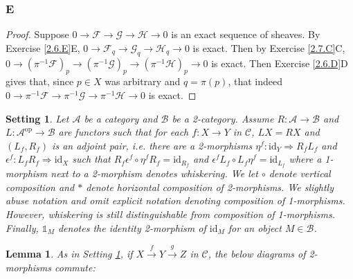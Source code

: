 \documentclass{article}
\newcommand{\id}{\mathrm{id}}
\newcommand{\fA}{\mathscr{A}}
\newcommand{\fB}{\mathscr{B}}
\newcommand{\fC}{\mathscr{C}}
\newcommand{\fF}{\mathscr{F}}
\newcommand{\fG}{\mathscr{G}}
\newcommand{\fH}{\mathscr{H}}
\newcommand{\altid}{\mathds{1}}
\DeclareMathOperator{\op}{op}
\newtheorem{lemma}[theorem]{Lemma}
\newtheorem{setting}{Setting}
\begin{document}
\subsubsection{E}\label{2.7.E}
\begin{proof}
    Suppose $0\to \fF \to \fG \to \fH \to 0$ is an exact sequence of sheaves. By Exercise \ref{2.6.E}E, $0\to \fF_q \to \fG_q\to \fH_q\to 0$ is exact. Then by Exercise \ref{2.7.C}C, $0\to (\pi^{-1} \fF)_p \to (\pi^{-1}\fG)_p\to (\pi^{-1} \fH)_p \to 0$ is exact. Then Exercise \ref{2.6.D}D gives that, since $p\in X$ was arbitrary and $q=\pi(p)$, that indeed $0\to \pi^{-1} \fF\to \pi^{-1} \fG \to \pi^{-1} \fH \to 0$ is exact.
\end{proof}
\begin{setting}\label{set:Adjoint functors into 2-category}
    Let $\fA$ be a category and $\fB$ be a 2-category. Assume $R:\fA \to \fB$ and $L:\fA^{\op} \to \fB$ are functors such that for each $f:X\to Y$ in $\fC$, $LX=RX$ and $(L_f, R_f)$ is an adjoint pair, i.e. there are a 2-morphisms $\eta^f:\id_Y \Rightarrow R_fL_f$ and $\epsilon^f:L_fR_f \Rightarrow \id_X$ such that $R_f \epsilon^f \circ \eta^f R_f = \id_{R_f}$ and $\epsilon^f L_f \circ L_f \eta^f = \id_{L_f}$ where a 1-morphism next to a 2-morphism denotes whiskering. We let $\circ$ denote vertical composition and $*$ denote horizontal composition of 2-morphisms. We slightly abuse notation and omit explicit notation denoting composition of 1-morphisms. However, whiskering is still distinguishable from composition of 1-morphisms. Finally, $\altid_M$ denotes the identity 2-morphism of $\id_M$ for an object $M\in \fB$.
\end{setting}
\begin{lemma}\label{lem:unit counit commute}
    As in Setting \ref{set:Adjoint functors into 2-category}, if $X\xrightarrow{f} Y \xrightarrow{g} Z$ in $\fC$, the below diagrams of 2-morphisms commute:
    \begin{center}
    \end{center}
    \begin{center}
    \end{center}
    \end{lemma}
\end{document}
